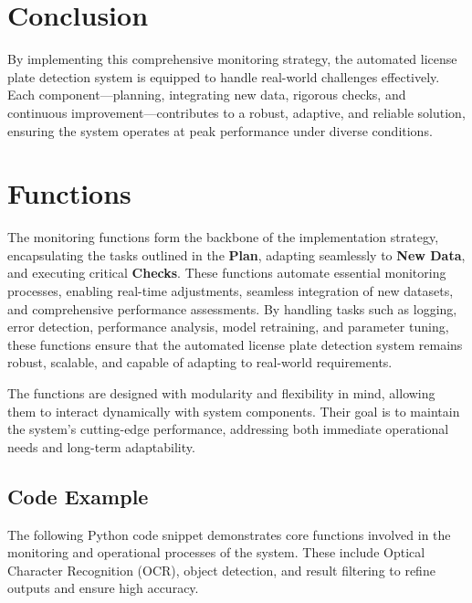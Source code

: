 \section{Conclusion}

By implementing this comprehensive monitoring strategy, the automated license plate detection system is equipped to handle real-world challenges effectively. Each component—planning, integrating new data, rigorous checks, and continuous improvement—contributes to a robust, adaptive, and reliable solution, ensuring the system operates at peak performance under diverse conditions.



\section{Functions}

The monitoring functions form the backbone of the implementation strategy, encapsulating the tasks outlined in the \textbf{Plan}, adapting seamlessly to \textbf{New Data}, and executing critical \textbf{Checks}. These functions automate essential monitoring processes, enabling real-time adjustments, seamless integration of new datasets, and comprehensive performance assessments. By handling tasks such as logging, error detection, performance analysis, model retraining, and parameter tuning, these functions ensure that the automated license plate detection system remains robust, scalable, and capable of adapting to real-world requirements.

The functions are designed with modularity and flexibility in mind, allowing them to interact dynamically with system components. Their goal is to maintain the system’s cutting-edge performance, addressing both immediate operational needs and long-term adaptability.

\subsection{Code Example}

The following Python code snippet demonstrates core functions involved in the monitoring and operational processes of the system. These include Optical Character Recognition (OCR), object detection, and result filtering to refine outputs and ensure high accuracy.

